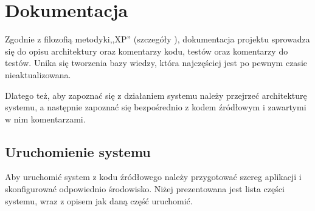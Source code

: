 \newpage
\section{Dokumentacja}
Zgodnie z filozofią metodyki,,XP'' (szczegóły ), dokumentacja projektu sprowadza się do opisu architektury oraz komentarzy kodu, testów oraz komentarzy do testów. Unika się tworzenia bazy wiedzy, która najczęściej jest po pewnym czasie nieaktualizowana.

Dlatego też, aby zapoznać się z działaniem systemu należy przejrzeć architekturę systemu, a następnie zapoznać się bezpośrednio z kodem źródłowym i zawartymi w nim komentarzami.

\subsection{Uruchomienie systemu}

Aby uruchomić system z kodu źródłowego należy przygotować szereg aplikacji i skonfigurować odpowiednio środowisko. Niżej prezentowana jest lista części systemu, wraz z opisem jak daną część uruchomić.

